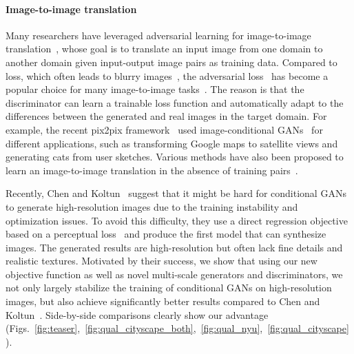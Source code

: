 \documentclass[10pt,twocolumn,letterpaper]{article}
\newcommand{\LOneLoss}{ }
\newcommand{\ck}{Chen and Koltun~\cite{chen2017photographic}\xspace}
\newcommand{\pp}{pix2pix\xspace}
\begin{document}
\paragraph{Image-to-image translation}
Many researchers have leveraged adversarial learning for image-to-image translation~\cite{isola2016image}, whose goal is to translate an input image from one domain to another domain given input-output image pairs as training data.
Compared to \LOneLoss loss, which often leads to blurry images~\cite{isola2016image,johnson2016perceptual}, 
the adversarial loss~\cite{goodfellow2014generative} has become a popular choice for many image-to-image tasks~\cite{wang2016generative,pathak2016context,karacan2016learning,zhang2017age,ledig2016photo,sangkloy2016scribbler,kaneko2017generative,dong2017semantic,zhu2017toward}. The reason is that the discriminator can learn a trainable loss function and automatically adapt to the differences between the generated and real images in the target domain. For example, the recent \pp framework~\cite{isola2016image} used image-conditional GANs~\cite{mirza2014conditional} for different applications, such as transforming Google maps to satellite views and generating cats from user sketches. Various methods have also been proposed to learn an image-to-image translation in the absence of training pairs~\cite{liu2016coupled,bousmalis2016unsupervised,liu2016unsupervised,shrivastava2016learning,taigman2016unsupervised,yi2017dualgan,zhu2017unpaired,tungadversarial}.

Recently, \ck suggest that it might be hard for conditional GANs to generate high-resolution images due to the training instability and optimization issues. To avoid this difficulty, they use a direct regression objective based on a perceptual loss~\cite{gatys2016image,dosovitskiy2016generating,johnson2016perceptual} and produce the first model that can synthesize  images. The generated results are high-resolution but often lack fine details and realistic textures. Motivated by their success, we show that using our new objective function as well as novel multi-scale generators and discriminators, we not only largely stabilize the training of conditional GANs on high-resolution images, but also achieve significantly better results compared to \ck. Side-by-side comparisons clearly show our advantage (Figs.~\ref{fig:teaser},~\ref{fig:qual_cityscape_both},~\ref{fig:qual_nyu},~\ref{fig:qual_cityscape}). 
\end{document}
